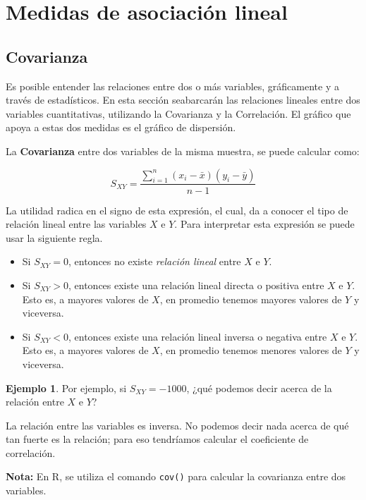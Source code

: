 \documentclass[
  11pt,
]{book}
\theoremstyle{definition}
\theoremstyle{definition}
\newtheorem{example}{Ejemplo}[chapter]
\theoremstyle{definition}
\theoremstyle{definition}
\theoremstyle{remark}
\begin{document}
\section{Medidas de asociación lineal}\label{regresion-lineal-medidas-asociacion}

\subsection{Covarianza}\label{regresion-lineal-covarianza}

Es posible entender las relaciones entre dos o más variables, gráficamente y a través de estadísticos. En esta sección seabarcarán las relaciones lineales entre dos variables cuantitativas, utilizando la Covarianza y la Correlación. El gráfico que apoya a estas dos medidas es el gráfico de dispersión.

La \textbf{Covarianza} entre dos variables de la misma muestra, se puede calcular como:

\begin{equation}
S_{XY} = \displaystyle\frac{\displaystyle\sum_{i=1}^n(x_i-\bar{x})(y_i-\bar{y})}{n-1}
\label{eq:Covarianza}
\end{equation}

La utilidad radica en el signo de esta expresión, el cual, da a conocer el tipo de relación lineal entre las variables \(X\) e \(Y\). Para interpretar esta expresión se puede usar la siguiente regla.

\begin{itemize}
\item
  Si \(S_{XY} = 0\), entonces no existe \emph{relación lineal} entre \(X\) e \(Y\).
\item
  Si \(S_{XY} > 0\), entonces existe una relación lineal directa o positiva entre \(X\) e \(Y\). Esto es, a mayores valores de \(X\), en promedio tenemos mayores valores de \(Y\) y viceversa.
\item
  Si \(S_{XY} < 0\), entonces existe una relación lineal inversa o negativa entre \(X\) e \(Y\). Esto es, a mayores valores de \(X\), en promedio tenemos menores valores de \(Y\) y viceversa.
\end{itemize}

\begin{example}
Por ejemplo, si \(S_{XY} = -1000\), ¿qué podemos decir acerca de la relación entre \(X\) e \(Y\)?

La relación entre las variables es inversa. No podemos decir nada acerca de qué tan fuerte es la relación; para eso tendríamos calcular el coeficiente de correlación.

\textbf{Nota:} En R, se utiliza el comando \texttt{cov()} para calcular la covarianza entre dos variables.
\end{example}
\end{document}

